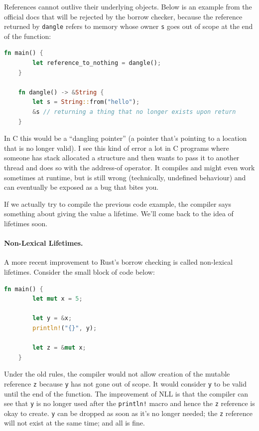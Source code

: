 References cannot outlive their underlying objects. Below is an example from the official docs that will be rejected by the borrow checker, because the reference returned by \texttt{dangle} refers to memory whose owner \texttt{s} goes out of scope at the end of the function:

\begin{lstlisting}[language=Rust]
    fn main() {
        let reference_to_nothing = dangle();
    }

    fn dangle() -> &String {
        let s = String::from("hello");
        &s // returning a thing that no longer exists upon return
    }
\end{lstlisting} 

In C this would be a ``dangling pointer'' (a pointer that's pointing to a location that is no longer valid). I see this kind of error a lot in C programs where someone has stack allocated a structure and then wants to pass it to another thread and does so with the address-of operator. It compiles and might even work sometimes at runtime, but is still wrong (technically, undefined behaviour) and can eventually be exposed as a bug that bites you.

If we actually try to compile the previous code example, the compiler says something about giving the value a lifetime. We'll come back to the idea of lifetimes soon.

\paragraph{Non-Lexical Lifetimes.} A more recent improvement to Rust's borrow checking is called non-lexical lifetimes. Consider the small block of code below:
\begin{lstlisting}[language=Rust]
    fn main() {
        let mut x = 5;

        let y = &x;
        println!("{}", y);

        let z = &mut x;
    }
\end{lstlisting}

Under the old rules, the compiler would not allow creation of the mutable reference \texttt{z} because \texttt{y} has not gone out of scope. It would consider \texttt{y} to be valid until the end of the function. The improvement of NLL is that the compiler can see that \texttt{y} is no longer used after the \texttt{println!} macro and hence the \texttt{z} reference is okay to create. \texttt{y} can be dropped as soon as it's no longer needed; the \texttt{z} reference will not exist at the same time; and all is fine.

